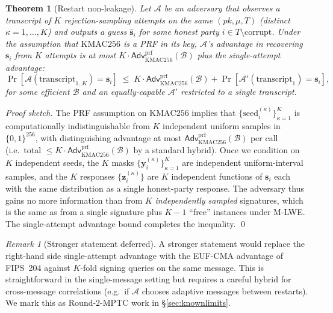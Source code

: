 \documentclass[11pt,a4paper]{article}
\newtheorem{theorem}{Theorem}
\theoremstyle{definition}
\theoremstyle{remark}
\newtheorem{remark}{Remark}
\newcommand{\Adv}{\mathsf{Adv}}
\newcommand{\KMAC}{\mathrm{KMAC256}}
\begin{document}
\begin{theorem}[Restart non-leakage]
\label{thm:restart-non-leak}
Let $\mathcal{A}$ be an adversary that observes a transcript of $K$
rejection-sampling attempts on the same $(\mathit{pk}, \mu, T)$
(distinct $\kappa = 1, \dots, K$) and outputs a guess
$\hat{\mathbf{s}}_i$ for some honest party $i \in T \setminus
\mathrm{corrupt}$. Under the assumption that $\KMAC$ is a PRF in its
key, $\mathcal{A}$'s advantage in recovering $\mathbf{s}_i$ from $K$
attempts is at most $K \cdot \Adv^{\mathrm{prf}}_{\KMAC}(\mathcal{B})$
plus the single-attempt advantage:
\[
\Pr[\mathcal{A}(\mathrm{transcript}_{1..K}) = \mathbf{s}_i]
\;\le\;
K \cdot \Adv^{\mathrm{prf}}_{\KMAC}(\mathcal{B})
+ \Pr[\mathcal{A}'(\mathrm{transcript}_{1}) = \mathbf{s}_i],
\]
for some efficient $\mathcal{B}$ and an equally-capable
$\mathcal{A}'$ restricted to a single transcript.
\end{theorem}

\begin{proof}[Proof sketch]
The PRF assumption on $\KMAC$ implies that
$\{\text{seed}_i^{(\kappa)}\}_{\kappa=1}^K$ is computationally
indistinguishable from $K$ independent uniform samples in
$\{0,1\}^{256}$, with distinguishing advantage at most
$\Adv^{\mathrm{prf}}_{\KMAC}(\mathcal{B})$ per call (i.e.\
total $\le K \cdot \Adv^{\mathrm{prf}}_{\KMAC}(\mathcal{B})$ by a
standard hybrid). Once we condition on $K$ independent seeds, the
$K$ masks $\{\mathbf{y}_i^{(\kappa)}\}_{\kappa=1}^K$ are independent
uniform-interval samples, and the $K$ responses
$\{\mathbf{z}_i^{(\kappa)}\}$ are $K$ independent functions of
$\mathbf{s}_i$ each with the same distribution as a single
honest-party response. The adversary thus gains no more information
than from $K$ \emph{independently sampled} signatures, which is the
same as from a single signature plus $K-1$ ``free'' instances under
M-LWE. The single-attempt advantage bound completes the
inequality. \qed
\end{proof}

\begin{remark}[Stronger statement deferred]
A stronger statement would replace the right-hand side
single-attempt advantage with the EUF-CMA advantage of FIPS~204
against $K$-fold signing queries on the same message. This is
straightforward in the single-message setting but requires a careful
hybrid for cross-message correlations (e.g.\ if $\mathcal{A}$
chooses adaptive messages between restarts). We mark this as
Round-2-MPTC work in \S\ref{sec:knownlimits}.
\end{remark}
\end{document}

